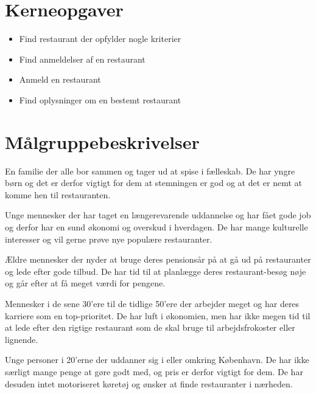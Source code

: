 \documentclass[a4paper, 12pt]{article}
\begin{document}
\section{Kerneopgaver}
\label{sec:Kerneopgaver}
\begin{itemize}
\item Find restaurant der opfylder nogle kriterier
\item Find anmeldelser af en restaurant
\item Anmeld en restaurant
\item Find oplysninger om en bestemt restaurant
\end{itemize}

\section{Målgruppebeskrivelser}
\label{sec:Maalgruppebeskrivelser}

\begin{description}[style=nextline,font=\bf]
  \item[Familier med små børn]

    En familie der alle bor sammen og tager ud at spise i
    fælleskab. De har yngre børn og det er derfor vigtigt for dem at
    stemningen er god og at det er nemt at komme hen til restauranten.

  \item[25--30 årige storby-par uden børn]

    Unge mennesker der har taget en længerevarende uddannelse og har
    fået gode job og derfor har en sund økonomi og overskud i
    hverdagen. De har mange kulturelle interesser og vil gerne prøve
    nye populære restauranter.

  \item[Pensionister]

    Ældre mennesker der nyder at bruge deres pensionsår på at gå ud på
    restauranter og lede efter gode tilbud. De har tid til at
    planlægge deres restaurant-besøg nøje og går efter at få meget
    værdi for pengene.

  \item[Karrieremennesker]

    Mennesker i de sene 30'ere til de tidlige 50'ere der arbejder
    meget og har deres karriere som en top-prioritet. De har luft i
    økonomien, men har ikke megen tid til at lede efter den rigtige
    restaurant som de skal bruge til arbejdsfrokoster eller lignende.

  \item[Studerende]

    Unge personer i 20'erne der uddanner sig i eller omkring
    København. De har ikke særligt mange penge at gøre godt med, og
    pris er derfor vigtigt for dem. De har desuden intet motoriseret
    køretøj og ønsker at finde restauranter i nærheden.
\end{description}
\end{document}
